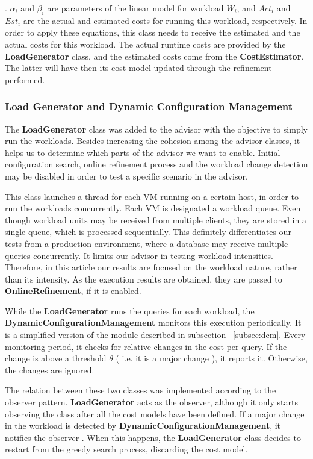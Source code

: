 \documentclass[jidm,a4paper]{jidm} %
\begin{document}
 . $\alpha_{i}$ and $\beta_{i}$ are parameters of the linear model for workload $W_{i}$, and $Act_{i}$ and $Est_{i}$ are the actual and estimated costs for running this workload, respectively. In order to apply these equations, this class needs to receive the estimated and the actual costs for this workload. The actual runtime costs are provided by the \textbf{LoadGenerator} class, and the estimated costs come from the \textbf{CostEstimator}. The latter will have then its cost model updated through the refinement performed.

\subsubsection{Load Generator and Dynamic Configuration Management}

The \textbf{LoadGenerator} class was added to the advisor with the objective to simply run the workloads. Besides increasing the cohesion among the advisor classes, it helps us to determine which parts of the advisor we want to enable. Initial configuration search, online refinement process and the workload change detection may be disabled in order to test a specific scenario in the advisor.

This class launches a thread for each VM running on a certain host, in order to run the workloads concurrently. Each VM is designated a workload queue. Even though workload units may be received from multiple clients, they are stored in a single queue, which is processed sequentially. This definitely differentiates our tests from a production environment, where a database may receive multiple queries concurrently. It limits our advisor in testing workload intensities. Therefore, in this article our results are focused on the workload nature, rather than its intensity. As the execution results are obtained, they are passed to \textbf{OnlineRefinement}, if it is enabled. 

While the \textbf{LoadGenerator} runs the queries for each workload, the \textbf{DynamicConfigurationManagement} monitors this execution periodically. 
It is a simplified version of the module described in subsection ~\ref{subsec:dcm}. Every monitoring period, it checks for relative changes in the cost per query. If the change is above a threshold $\theta$ ( i.e. it is a major change ), it reports it. Otherwise, the changes are ignored.

The relation between these two classes was implemented according to the observer pattern. \textbf{LoadGenerator} acts as the observer, although it only starts observing the class after all the cost models have been defined. If a major change in the workload is detected by \textbf{DynamicConfigurationManagement}, it notifies the observer . When this happens, the \textbf{LoadGenerator} class decides to restart from the greedy search process, discarding the cost model.
\end{document}
